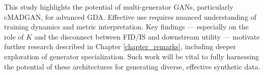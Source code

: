 This study highlights the potential of multi-generator GANs, particularly cMADGAN, for advanced GDA. Effective use requires nuanced understanding of training dynamics and metric interpretation. Key findings — especially on the role of \(K\) and the disconnect between FID/IS and downstream utility — motivate further research described in Chapter \ref{chapter_remarks}, including deeper exploration of generator specialization. Such work will be vital to fully harnessing the potential of these architectures for generating diverse, effective synthetic data.



%




